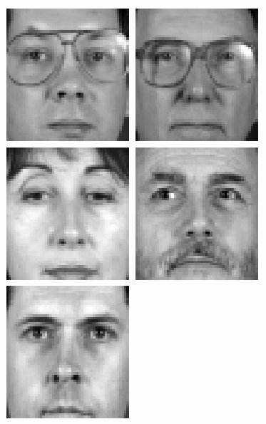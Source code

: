 \begin{figure}
\begin{center}
\includegraphics[scale=0.12]{ch4/figures/XM2VTS_41.png}
\includegraphics[scale=0.12]{ch4/figures/XM2VTS_42.png}
\includegraphics[scale=0.12]{ch4/figures/XM2VTS_43.png}
\includegraphics[scale=0.12]{ch4/figures/XM2VTS_44.png}
\includegraphics[scale=0.12]{ch4/figures/XM2VTS_45.png}

\end{center}
\end{figure}
